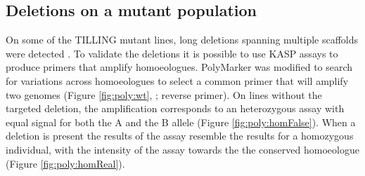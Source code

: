 \subsection{Deletions on a mutant population}
\label{poly:dels}  

On some of the TILLING mutant lines, long deletions spanning multiple scaffolds were detected \citep{Krasileva2016}.
To validate the deletions it is possible to use KASP assays to produce primers that amplify homoeologues.  
PolyMarker was modified to search for variations across homoeologues to select a common primer that will amplify two genomes (Figure \ref{fig:poly:wt}, ; reverse primer). 
On lines without the targeted deletion, the amplification corresponds to an heterozygous assay with equal signal for both the A and the B allele (Figure \ref{fig:poly:homFalse}).  
When a deletion is present the results of the assay resemble the results for a homozygous individual, with the intensity of the assay towards the the conserved homoeologue (Figure \ref{fig:poly:homReal}).

